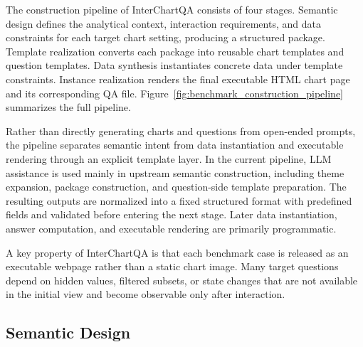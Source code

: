 \documentclass[review,journal,hideappendix]{vgtc} %
\newcommand{\dataset}{InterChartQA}
\newcommand{\placeholder}[1]{\textcolor{red}{\textbf{[Placeholder: #1]}}}
\begin{document}

The construction pipeline of \dataset{} consists of four stages. Semantic design defines the analytical context, interaction requirements, and data constraints for each target chart setting, producing a structured package. Template realization converts each package into reusable chart templates and question templates. Data synthesis instantiates concrete data under template constraints. Instance realization renders the final executable HTML chart page and its corresponding QA file. Figure~\ref{fig:benchmark_construction_pipeline} summarizes the full pipeline.

Rather than directly generating charts and questions from open-ended prompts, the pipeline separates semantic intent from data instantiation and executable rendering through an explicit template layer. 
In the current pipeline, LLM assistance is used mainly in upstream semantic construction, including theme expansion, package construction, and question-side template preparation. The resulting outputs are normalized into a fixed structured format with predefined fields and validated before entering the next stage. Later data instantiation, answer computation, and executable rendering are primarily programmatic.

A key property of \dataset{} is that each benchmark case is released as an executable webpage rather than a static chart image. Many target questions depend on hidden values, filtered subsets, or state changes that are not available in the initial view and become observable only after interaction.


\subsection{Semantic Design}
\end{document}

